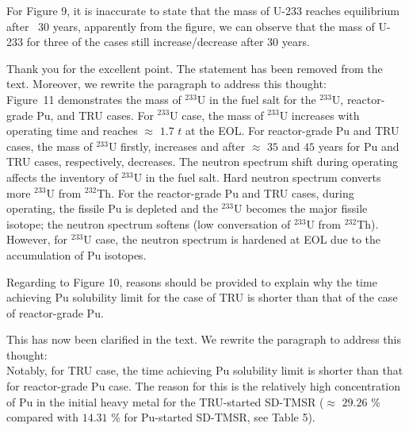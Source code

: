 \documentclass[answers,11pt]{exam}
\begin{document}
\begin{questions}
        \question For Figure 9, it is inaccurate to state that the mass of U-233 reaches equilibrium after ~30 years, apparently from the figure, we can observe that the mass of U-233 for three of the cases still increase/decrease after 30 years.
        
        \begin{solution}
                Thank you for the excellent point. The statement has been removed from the text.
                Moreover, we rewrite the paragraph to address this thought:\\
                
                Figure~11 demonstrates the mass of $^{233}$U in the fuel salt for the $^{233}$U, reactor-grade Pu, and TRU cases. For $^{233}$U case, the mass of $^{233}$U increases with operating time and reaches $\approx$ $1.7$ $t$ at the EOL. For reactor-grade Pu and TRU cases, the mass of $^{233}$U firstly, increases and after $\approx$ $35$ and $45$ years for Pu and TRU cases, respectively, decreases. The neutron spectrum shift during operating affects the inventory of $^{233}$U in the fuel salt. Hard neutron spectrum converts more $^{233}$U from $^{232}$Th. For the reactor-grade Pu and TRU cases, during operating, the fissile Pu is depleted and the $^{233}$U becomes the major fissile isotope; the neutron spectrum softens (low conversation of $^{233}$U from $^{232}$Th). However, for $^{233}$U case, the neutron spectrum is hardened at EOL due to the accumulation of Pu isotopes.                
                
        \end{solution}

        \question Regarding to Figure 10, reasons should be provided to explain why the time achieving Pu solubility limit for the case of TRU is shorter than that of the case of reactor-grade Pu.
        \begin{solution}
                 This has now been clarified in the text.
                 We rewrite the paragraph to address this thought:\\
                 
                 Notably, for TRU case, the time achieving Pu solubility limit is shorter than that for reactor-grade Pu case. The reason for this is the relatively high concentration of Pu in the initial heavy metal for the TRU-started SD-TMSR ($\approx$ $29.26$ \% compared with $14.31$ \% for Pu-started SD-TMSR, see Table 5).
                 

\end{solution}
\end{questions}
\end{document}
